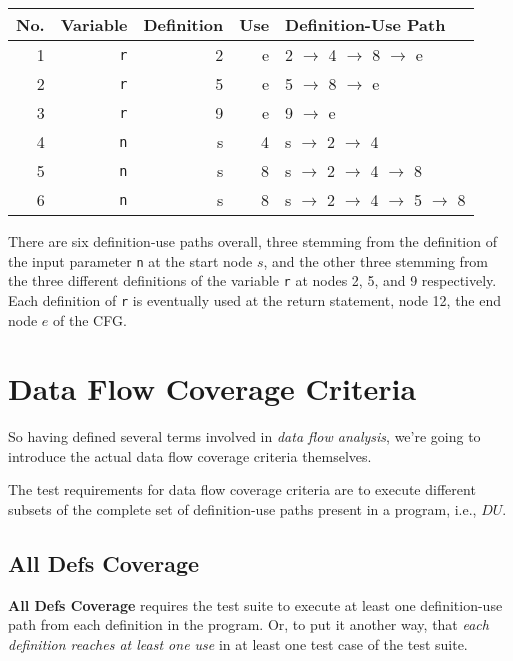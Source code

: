 \begin{center}
\begin{tabular}{rrrrl}
    \toprule
    No. & Variable & Definition & Use & Definition-Use Path \\
    \midrule
    1 & {\tt r}  &          2 &   e & 2 $\rightarrow$ 4 $\rightarrow$ 8 $\rightarrow$ e \\
    2 & {\tt r}  &          5 &   e & 5 $\rightarrow$ 8 $\rightarrow$ e \\
    3 & {\tt r}  &          9 &   e & 9 $\rightarrow$ e \\
    4 & {\tt n}  &          s &   4 & s $\rightarrow$ 2 $\rightarrow$ 4 \\
    5 & {\tt n}  &          s &   8 & s $\rightarrow$ 2 $\rightarrow$ 4 $\rightarrow$ 8 \\
    6 & {\tt n}  &          s &   8 & s $\rightarrow$ 2 $\rightarrow$ 4 $\rightarrow$ 5 $\rightarrow$ 8 \\
    \bottomrule
\end{tabular}
\end{center}

There are six definition-use paths overall, three stemming from the definition of the
input parameter {\tt n} at the start node $s$, and the other three stemming from
the three different definitions of the variable {\tt r} at nodes 2, 5, and 9
respectively. Each definition of {\tt r} is eventually used at the return
statement, node 12, the end node $e$ of the CFG.


\section{Data Flow Coverage Criteria}

So having defined several terms involved in {\it data flow analysis}, we're
going to introduce the actual data flow coverage criteria themselves.

The test requirements for data flow coverage criteria are to execute different
subsets of the complete set of definition-use paths present in a program, i.e.,
$\mathit{DU}$.


\subsection{All Defs Coverage}

{\bf All Defs Coverage} requires the test suite to execute at least one
definition-use path from each definition in the program. Or, to put it another
way, that {\it each definition reaches at least one use} in at least one test
case of the test suite.

